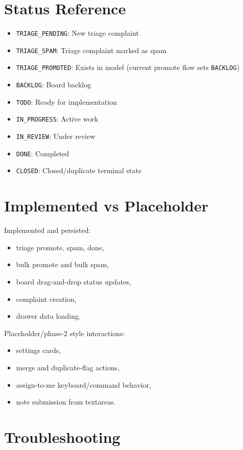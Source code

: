 \documentclass[11pt,a4paper]{article}
\begin{document}
\section{Status Reference}
\begin{itemize}
  \item \texttt{TRIAGE\_PENDING}: New triage complaint
  \item \texttt{TRIAGE\_SPAM}: Triage complaint marked as spam
  \item \texttt{TRIAGE\_PROMOTED}: Exists in model (current promote flow sets \texttt{BACKLOG})
  \item \texttt{BACKLOG}: Board backlog
  \item \texttt{TODO}: Ready for implementation
  \item \texttt{IN\_PROGRESS}: Active work
  \item \texttt{IN\_REVIEW}: Under review
  \item \texttt{DONE}: Completed
  \item \texttt{CLOSED}: Closed/duplicate terminal state
\end{itemize}

\section{Implemented vs Placeholder}
Implemented and persisted:
\begin{itemize}
  \item triage promote, spam, done,
  \item bulk promote and bulk spam,
  \item board drag-and-drop status updates,
  \item complaint creation,
  \item drawer data loading.
\end{itemize}

Placeholder/phase-2 style interactions:
\begin{itemize}
  \item settings cards,
  \item merge and duplicate-flag actions,
  \item assign-to-me keyboard/command behavior,
  \item note submission from textareas.
\end{itemize}

\section{Troubleshooting}
\end{document}

